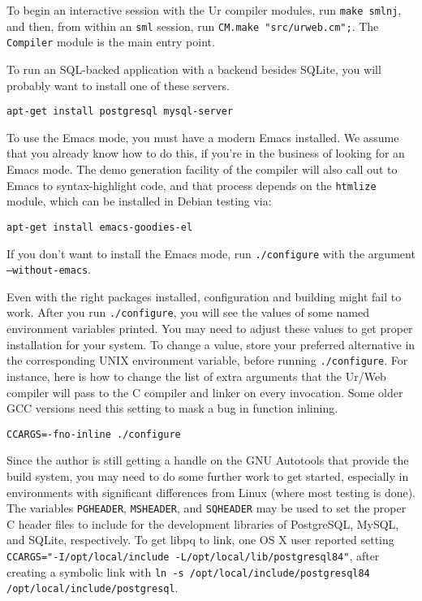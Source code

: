 \documentclass{article}
\begin{document}
To begin an interactive session with the Ur compiler modules, run \texttt{make smlnj}, and then, from within an \texttt{sml} session, run \texttt{CM.make "src/urweb.cm";}.  The \texttt{Compiler} module is the main entry point.

To run an SQL-backed application with a backend besides SQLite, you will probably want to install one of these servers.

\begin{verbatim}
apt-get install postgresql mysql-server
\end{verbatim}

To use the Emacs mode, you must have a modern Emacs installed.  We assume that you already know how to do this, if you're in the business of looking for an Emacs mode.  The demo generation facility of the compiler will also call out to Emacs to syntax-highlight code, and that process depends on the \texttt{htmlize} module, which can be installed in Debian testing via:

\begin{verbatim}
apt-get install emacs-goodies-el
\end{verbatim}

If you don't want to install the Emacs mode, run \texttt{./configure} with the argument \texttt{--without-emacs}.

Even with the right packages installed, configuration and building might fail to work.  After you run \texttt{./configure}, you will see the values of some named environment variables printed.  You may need to adjust these values to get proper installation for your system.  To change a value, store your preferred alternative in the corresponding UNIX environment variable, before running \texttt{./configure}.  For instance, here is how to change the list of extra arguments that the Ur/Web compiler will pass to the C compiler and linker on every invocation.  Some older GCC versions need this setting to mask a bug in function inlining.

\begin{verbatim}
CCARGS=-fno-inline ./configure
\end{verbatim}

Since the author is still getting a handle on the GNU Autotools that provide the build system, you may need to do some further work to get started, especially in environments with significant differences from Linux (where most testing is done).  The variables \texttt{PGHEADER}, \texttt{MSHEADER}, and \texttt{SQHEADER} may be used to set the proper C header files to include for the development libraries of PostgreSQL, MySQL, and SQLite, respectively.  To get libpq to link, one OS X user reported setting \texttt{CCARGS="-I/opt/local/include -L/opt/local/lib/postgresql84"}, after creating a symbolic link with \texttt{ln -s /opt/local/include/postgresql84 /opt/local/include/postgresql}.
\end{document}
